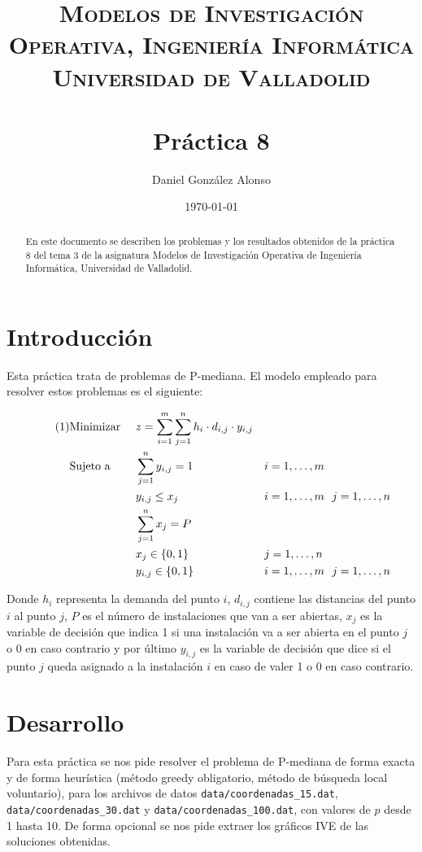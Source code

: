 \documentclass[a4paper,11pt]{article}
\title{
	\vspace{-25pt}
	\normalfont \Large \textsc{
		Modelos de Investigación Operativa,
        Ingeniería Informática\\
        Universidad de Valladolid
	}\\[10pt]
	\horrule{1pt}\\[10pt]
	\huge \textbf{
		Práctica 8
	}\\
	\horrule{1pt}
}
\author{
	\normalfont \Large Daniel González Alonso
}
\date{
	\normalfont \large \today
}
\newcommand\numberthis{							%
	\addtocounter{equation}{1}\tag{\theequation}
}
\begin{document}
\maketitle

\begin{abstract}
	En este documento se describen los problemas y los resultados obtenidos de la práctica 8 del tema 3 de la asignatura Modelos de Investigación Operativa de Ingeniería Informática, Universidad de Valladolid.
\end{abstract}

\section{Introducción}
Esta práctica trata de problemas de P-mediana. El modelo empleado para resolver estos problemas es el siguiente:

\begin{align*}\numberthis
   	&\textrm{Minimizar }	&& z = \sum_{i=1}^{m}{\sum_{j=1}^{n}{h_i \cdot d_{i,j} \cdot y_{i,j}}}	&& \\
   	&\textrm{Sujeto a }		&& \sum_{j=1}^{n}{y_{i,j}} = 1 					&& i=1,\ldots,m \\
    &						&& y_{i,j} \leq x_j								&& i=1,\ldots,m \ \ j=1,\ldots,n \\
    &						&& \sum_{j=1}^{n}{x_j} = P						&&				\\
	&						&& x_{j} \in \{0,1\}							&& j=1,\ldots,n \\
	&						&& y_{i,j} \in \{0,1\}							&& i=1,\ldots,m \ \ j=1,\ldots,n
\end{align*}

Donde ${h_i}$ representa la demanda del punto ${i}$, ${d_{i,j}}$ contiene las distancias del punto ${i}$ al punto ${j}$, ${P}$ es el número de instalaciones que van a ser abiertas, ${x_j}$ es la variable de decisión que indica 1 si una instalación va a ser abierta en el punto ${j}$ o 0 en caso contrario y por último ${y_{i,j}}$ es la variable de decisión que dice si el punto ${j}$ queda asignado a la instalación ${i}$ en caso de valer 1 o 0 en caso contrario.


\newpage
\section{Desarrollo}
Para esta práctica se nos pide resolver el problema de P-mediana de forma exacta y de forma heurística (método greedy obligatorio, método de búsqueda local voluntario), para los archivos de datos \texttt{data/coordenadas\_15.dat}, \texttt{data/coordenadas\_30.dat} y \texttt{data/coordenadas\_100.dat}, con valores de ${p}$ desde 1 hasta 10. De forma opcional se nos pide extraer los gráficos IVE de las soluciones obtenidas.\\
\end{document}
